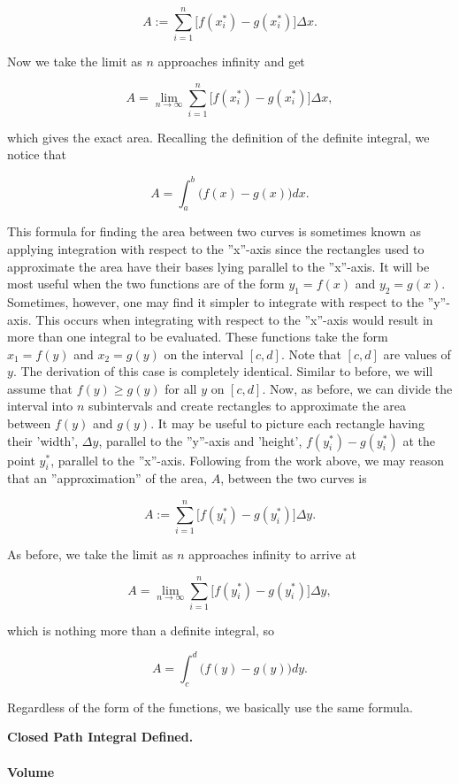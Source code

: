 $$A := \sum_{i=1}^n \Big[f(x_i^\ast) - g(x_i^\ast)\Big] \Delta x.$$

Now we take the limit as $n$ approaches infinity and get

$$A = \lim_{n \to \infty} \sum_{i=1}^n \Big[f(x_i^\ast) - g(x_i^\ast)\Big] \Delta x,$$

which gives the exact area. Recalling the definition of the definite integral, we notice that

$$A = \int_a^b \bigl(f(x) - g(x)\bigr) dx.$$

This formula for finding the area between two curves is sometimes known as applying integration with respect to the ''x''-axis since the rectangles used to approximate the area have their bases lying parallel to the ''x''-axis. It will be most useful when the two functions are of the form $y_1 = f(x)$ and $y_2 = g(x)$. Sometimes, however, one may find it simpler to integrate with respect to the ''y''-axis. This occurs when integrating with respect to the ''x''-axis would result in more than one integral to be evaluated. These functions take the form $x_1 = f(y)$ and $x_2 = g(y)$ on the interval $[c,d]$. Note that $[c,d]$ are values of $y$. The derivation of this case is completely identical. Similar to before, we will assume that $f(y) \ge g(y)$ for all $y$ on $[c,d]$. Now, as before, we can divide the interval into $n$ subintervals and create rectangles to approximate the area between $f(y)$ and $g(y)$. It may be useful to picture each rectangle having their 'width', $\Delta y$, parallel to the ''y''-axis and 'height', $f(y_i^\ast) - g(y_i^\ast)$ at the point $y_i^\ast$, parallel to the ''x''-axis. Following from the work above, we may reason that an ''approximation'' of the area, $A$, between the two curves is

$$A := \sum_{i=1}^n \Big[f(y_i^\ast) - g(y_i^\ast)\Big] \Delta y.$$

As before, we take the limit as $n$ approaches infinity to arrive at

$$A = \lim_{n \to \infty} \sum_{i=1}^n \Big[f(y_i^\ast) - g(y_i^\ast)\Big] \Delta y,$$

which is nothing more than a definite integral, so

$$A = \int_c^d \bigl(f(y) - g(y)\bigr) dy.$$

Regardless of the form of the functions, we basically use the same formula.

\textbf{Closed Path Integral Defined.}

\paragraph{Volume}

